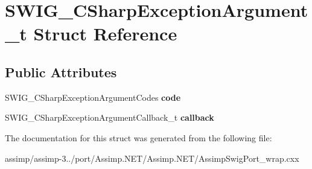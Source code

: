 \hypertarget{struct_s_w_i_g___c_sharp_exception_argument__t}{\section{S\+W\+I\+G\+\_\+\+C\+Sharp\+Exception\+Argument\+\_\+t Struct Reference}
\label{struct_s_w_i_g___c_sharp_exception_argument__t}
}
\subsection*{Public Attributes}
\begin{DoxyCompactItemize}
\item 
\hypertarget{struct_s_w_i_g___c_sharp_exception_argument__t_a8c87eccaa5242cbf10a00e9571fc9208}{S\+W\+I\+G\+\_\+\+C\+Sharp\+Exception\+Argument\+Codes {\bfseries code}}\label{struct_s_w_i_g___c_sharp_exception_argument__t_a8c87eccaa5242cbf10a00e9571fc9208}

\item 
\hypertarget{struct_s_w_i_g___c_sharp_exception_argument__t_a1ce5e3abc49f6350a17b9fcfd990b321}{S\+W\+I\+G\+\_\+\+C\+Sharp\+Exception\+Argument\+Callback\+\_\+t {\bfseries callback}}\label{struct_s_w_i_g___c_sharp_exception_argument__t_a1ce5e3abc49f6350a17b9fcfd990b321}

\end{DoxyCompactItemize}


The documentation for this struct was generated from the following file\+:\begin{DoxyCompactItemize}
\item 
assimp/assimp-\/3../port/\+Assimp.\+N\+E\+T/\+Assimp.\+N\+E\+T/Assimp\+Swig\+Port\+\_\+wrap.\+cxx\end{DoxyCompactItemize}
